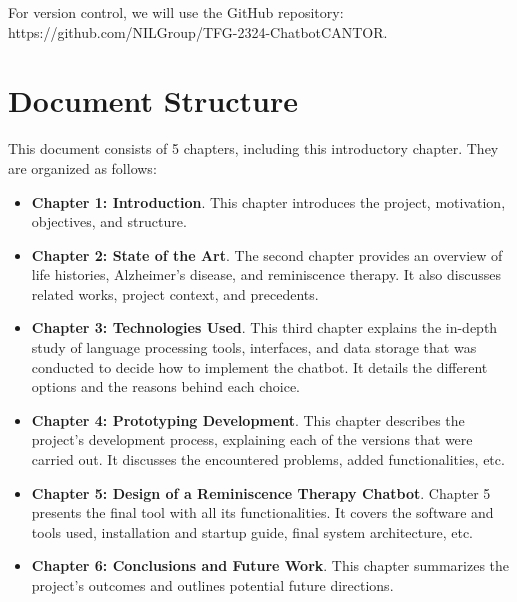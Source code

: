 For version control, we will use the GitHub repository:\\
https://github.com/NILGroup/TFG-2324-ChatbotCANTOR.

\section{Document Structure}
This document consists of 5 chapters, including this introductory chapter. They are organized as follows:

\begin{itemize}
	\item \textbf{Chapter 1: Introduction}. This chapter introduces the project, motivation, objectives, and structure.
	\item \textbf{Chapter 2: State of the Art}. The second chapter provides an overview of life histories, Alzheimer's disease, and reminiscence therapy. It also discusses related works, project context, and precedents.
	\item \textbf{Chapter 3: Technologies Used}. This third chapter explains the in-depth study of language processing tools, interfaces, and data storage that was conducted to decide how to implement the chatbot. It details the different options and the reasons behind each choice.
	\item \textbf{Chapter 4: Prototyping Development}. This chapter describes the project's development process, explaining each of the versions that were carried out. It discusses the encountered problems, added functionalities, etc.
	\item \textbf{Chapter 5: Design of a Reminiscence Therapy Chatbot}. Chapter 5 presents the final tool with all its functionalities. It covers the software and tools used, installation and startup guide, final system architecture, etc.
	\item \textbf{Chapter 6: Conclusions and Future Work}. This chapter summarizes the project's outcomes and outlines potential future directions.
	
\end{itemize}
